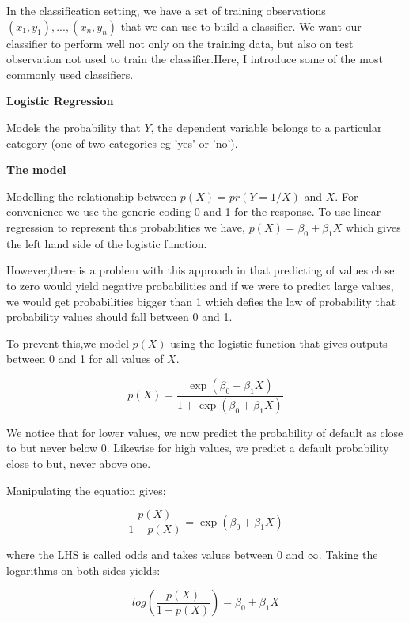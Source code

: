 In the classification setting, we have a set of training observations $(x_{1},y_{1}),...,(x_{n},y_{n})$ that we can use to build a classifier. We want our classifier to perform well not only on the training data, but also on test observation not used to train the classifier.Here, I introduce some of the most commonly used classifiers.

\begin{center}
\textbf{Logistic Regression}
\end{center}

Models the probability that $Y$, the dependent variable belongs to a particular category (one of two categories eg 'yes' or 'no').


\textbf{The model}

Modelling the relationship between $p(X)=pr(Y=1/X)$ and $X$. For convenience we use the generic coding 0 and 1 for the response. To use linear regression to represent this probabilities we have, $p(X)=\beta_{0}+\beta_{1}X$ which gives the left hand side of the logistic function. 

However,there is a problem with this approach in that predicting of values close to zero would yield negative probabilities and if we were to predict large values, we would get probabilities bigger than 1 which defies the law of probability that probability values should fall between 0 and 1.

To prevent this,we model $p(X)$ using the logistic function that gives outputs between 0 and 1 for all values of $X$. 

\begin{equation*}
p(X)=\dfrac{\exp(\beta_0+\beta_{1}X)}{1+\exp(\beta_0+\beta_{1}X)}
\end{equation*}

We notice that for lower values, we now predict the probability of default as close to but never below $0$. Likewise for high values, we predict a default probability close to but, never above one.

Manipulating the equation gives;

\begin{equation}
\dfrac{p(X)}{1-p(X)}=\exp (\beta _0+\beta_{1}X)
\end{equation}

where the LHS is called odds and takes values between $0$ and $\infty$. Taking the logarithms on both sides yields:

\begin{equation}
log \left(\dfrac{p(X)}{1-p(X)}\right)=\beta_{0}+\beta_{1}X
\end{equation}

